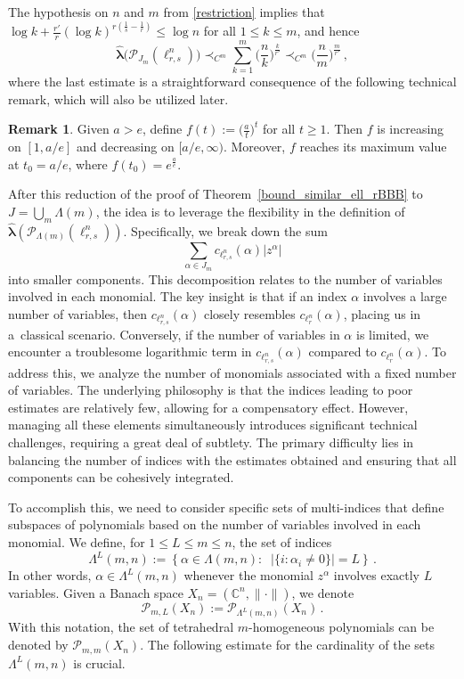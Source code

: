 \documentclass[12pt]{amsart}
\numberwithin{subsection}{section}
\theoremstyle{definition}
\newtheorem{remark}[theorem]{Remark}
\theoremstyle{remark}
\begin{document}
The hypothesis on $n$ and $m$ from \eqref{restriction} implies
that $\log k + \frac{r'}{r}(\log k)^{r(\frac1{s}-\frac1{r})} \le  \log n$  for all $1 \leq k \leq m$, and hence
\begin{equation}\label{red2}
\widehat{\boldsymbol{\lambda}}\big(\mathcal P_{J_m}(\ell_{r,s}^n)\big)
\prec_{C^m} \sum_{k=1}^{m}  \Big(\frac{n}{k} \Big)^{\frac{k}{r'}} \prec_{C^m}  \Big(\frac{n}{m} \Big)^{\frac{m}{r'}}\,,
\end{equation}
where the last estimate is a straightforward consequence of the following technical remark, which will also be utilized later.
\begin{remark} \label{rem: bound for n/klog(n)}
Given $a>e$, define $f(t) := \big(\frac{a}{t}\big)^t$ for all $t\geq 1$. Then $f$ is increasing on $[1, a/e]$
and decreasing on $[a/e, \infty)$.  Moreover, $f$ reaches its maximum value at $t_0 = a/e$, where $f(t_0)= e^{\frac{a}{e}}$.
\end{remark}

\hspace{20 mm}

After this reduction of the proof of Theorem~\ref{bound_similar_ell_rBBB} to \( J = \bigcup_m\Lambda(m) \), the  idea is to
leverage the flexibility in the definition of \(\widehat{\boldsymbol{\lambda}}(\mathcal{P}_{\Lambda(m)}(\ell_{r,s}^n))\).
Specifically, we break down the sum
\[
\sum_{\alpha \in J_m} c_{\ell_{r,s}^n}(\alpha) |z^{\alpha}|
\]
into smaller components. This decomposition relates to the number of variables involved in each monomial. The key insight is
that if an index $\alpha$ involves a large number of variables, then $c_{\ell_{r,s}^n}(\alpha)$ closely resembles $c_{\ell_{r}^n}(\alpha)$,
placing us in a~classical scenario. Conversely, if the number of variables in $\alpha$ is limited, we encounter a troublesome
logarithmic term in
$
c_{\ell_{r,s}^n}(\alpha)
$
compared to $c_{\ell_{r}^n}(\alpha)$.
To address this, we analyze the number of monomials associated with a fixed number of variables. The underlying philosophy is that
the indices leading to poor estimates are relatively few, allowing for a compensatory effect. However, managing all these elements
simultaneously introduces significant technical challenges, requiring a great deal of subtlety. The primary difficulty lies in
balancing the number of indices with the estimates obtained and ensuring that all components can be cohesively integrated.


To accomplish this, we need to consider specific sets of multi-indices that define subspaces of polynomials based on the number of
variables involved in each monomial. We define, for $1 \le L \le m \leq n$, the set of indices
\[
\Lambda^L(m,n):=\left\{\alpha \in \Lambda(m,n) : \;\; \vert\{ i : \alpha_i \neq 0\} \vert = L \right\}\,.
\]
In other words,  $\alpha\in \Lambda^L(m,n)$ whenever the monomial $z^\alpha$ involves exactly $L$ variables.
Given a Banach space $X_n=(\mathbb C^n,\|\cdot\|)$, we denote
\[
\mathcal{P}_{m,L}(X_n):=  \mathcal{P}_{\Lambda^L(m,n)}(X_n)\,.
\]
With this notation, the set of tetrahedral \( m \)-homogeneous polynomials can be denoted by $\mathcal{P}_{m,m}(X_n)$. The following
estimate for the cardinality of the sets $\Lambda^{L}(m,n)$ is crucial.
\end{document}
